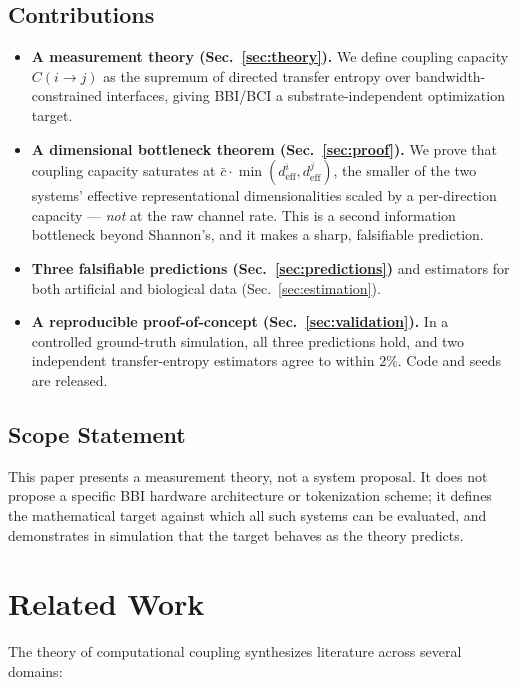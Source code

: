 \documentclass[11pt]{article}
\begin{document}
\subsection{Contributions}
\begin{itemize}[leftmargin=1.2em]
    \item \textbf{A measurement theory (Sec.~\ref{sec:theory}).} We define coupling capacity $C(i\!\to\!j)$ as the supremum of directed transfer entropy over bandwidth-constrained interfaces, giving BBI/BCI a substrate-independent optimization target.
    \item \textbf{A dimensional bottleneck theorem (Sec.~\ref{sec:proof}).} We prove that coupling capacity saturates at $\bar{c}\cdot\min(d_{\mathrm{eff}}^i, d_{\mathrm{eff}}^j)$, the smaller of the two systems' effective representational dimensionalities scaled by a per-direction capacity --- \emph{not} at the raw channel rate. This is a second information bottleneck beyond Shannon's, and it makes a sharp, falsifiable prediction.
    \item \textbf{Three falsifiable predictions (Sec.~\ref{sec:predictions})} and estimators for both artificial and biological data (Sec.~\ref{sec:estimation}).
    \item \textbf{A reproducible proof-of-concept (Sec.~\ref{sec:validation}).} In a controlled ground-truth simulation, all three predictions hold, and two independent transfer-entropy estimators agree to within $2\%$. Code and seeds are released.
\end{itemize}

\subsection{Scope Statement}
This paper presents a measurement theory, not a system proposal. It does not propose a specific BBI hardware architecture or tokenization scheme; it defines the mathematical target against which all such systems can be evaluated, and demonstrates in simulation that the target behaves as the theory predicts.

\section{Related Work}

The theory of computational coupling synthesizes literature across several domains:
\end{document}
